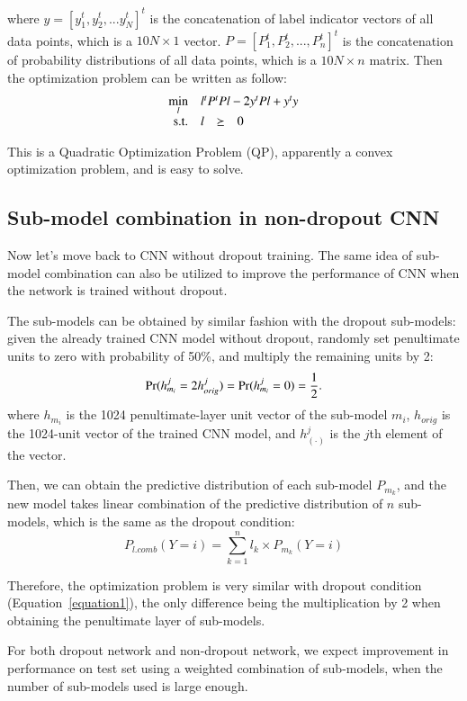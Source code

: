 \documentclass{article} %
\begin{document}
where $y = \left[ y_{1}^{t}, y_{2}^{t},...y_{N}^{t}\right]^{t}$ is the concatenation of label indicator vectors of all data points, which is a $10N\times 1$ vector. $P = \left[ P_{1}^{t},P_{2}^{t},..., P_{n}^{t}\right]^{t}$ is the concatenation of probability distributions of all data points, which is a $10N \times n$  matrix. Then the optimization problem can be written as follow:
\begin{equation}
\begin{array}{rrclcl}
\displaystyle \min_{l} & \multicolumn{3}{l}{l^{t}P^{t}Pl-2y^{t}Pl+y^{t}y}\\
\textrm{s.t.} & l& \succeq & 0\\
\end{array}
\label{equation1}
\end{equation}
\par
This is a Quadratic Optimization Problem (QP), apparently a convex optimization problem, and is easy to solve.



\subsection{Sub-model combination in non-dropout CNN}
Now let's move back to CNN without dropout training. The same idea of sub-model combination can also be utilized to improve the performance of CNN when the network is trained without dropout. 
\par
The sub-models can be obtained by similar fashion with the dropout sub-models: given the already trained CNN model without dropout, randomly set penultimate units to zero with probability of 50\%, and multiply the remaining units by 2:
\begin{equation}
\textup{Pr}(h_{m_{i}}^{j}=2h_{orig}^{j})=\textup{Pr}(h_{m_{i}}^{j}=0)=\frac{1}{2}.
\end{equation}
where  $h_{m_{i}}$ is the 1024 penultimate-layer unit vector of the sub-model $m_{i}$, $h_{orig}$ is the 1024-unit vector of the trained CNN model, and $h_{(\cdot)}^{j}$ is the $j$th element of the vector. 
\par
Then, we can obtain the predictive distribution of each sub-model $P_{m_{k}}$, and the new model takes linear combination of the predictive distribution of $n$ sub-models, which is the same as the dropout condition:
\begin{equation}
P_{l.comb}(Y=i) = \sum_{k=1}^{n}l_{k}\times P_{m_{k}}(Y=i)
\end{equation}
\par
Therefore, the optimization problem is very similar with dropout condition (Equation~\ref{equation1}),  the only difference being the multiplication by 2 when obtaining the penultimate layer of sub-models.
\par
For both dropout network and non-dropout network, we expect improvement in performance on test set using a weighted combination of sub-models, when the number of sub-models used is large enough.
\end{document}
